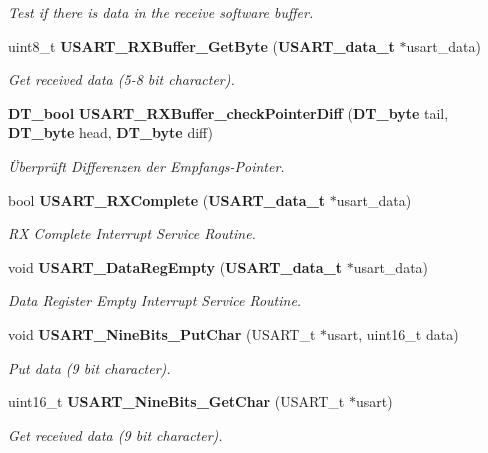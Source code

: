 \begin{DoxyCompactItemize}
\begin{DoxyCompactList}\small\item\em Test if there is data in the receive software buffer. \item\end{DoxyCompactList}\item 
uint8\_\-t {\bf USART\_\-RXBuffer\_\-GetByte} ({\bf USART\_\-data\_\-t} $\ast$usart\_\-data)
\begin{DoxyCompactList}\small\item\em Get received data (5-\/8 bit character). \item\end{DoxyCompactList}\item 
{\bf DT\_\-bool} {\bf USART\_\-RXBuffer\_\-checkPointerDiff} ({\bf DT\_\-byte} tail, {\bf DT\_\-byte} head, {\bf DT\_\-byte} diff)
\begin{DoxyCompactList}\small\item\em Überprüft Differenzen der Empfangs-\/Pointer. \item\end{DoxyCompactList}\item 
bool {\bf USART\_\-RXComplete} ({\bf USART\_\-data\_\-t} $\ast$usart\_\-data)
\begin{DoxyCompactList}\small\item\em RX Complete Interrupt Service Routine. \item\end{DoxyCompactList}\item 
void {\bf USART\_\-DataRegEmpty} ({\bf USART\_\-data\_\-t} $\ast$usart\_\-data)
\begin{DoxyCompactList}\small\item\em Data Register Empty Interrupt Service Routine. \item\end{DoxyCompactList}\item 
void {\bf USART\_\-NineBits\_\-PutChar} (USART\_\-t $\ast$usart, uint16\_\-t data)
\begin{DoxyCompactList}\small\item\em Put data (9 bit character). \item\end{DoxyCompactList}\item 
uint16\_\-t {\bf USART\_\-NineBits\_\-GetChar} (USART\_\-t $\ast$usart)
\begin{DoxyCompactList}\small\item\em Get received data (9 bit character). \item\end{DoxyCompactList}\end{DoxyCompactItemize}


